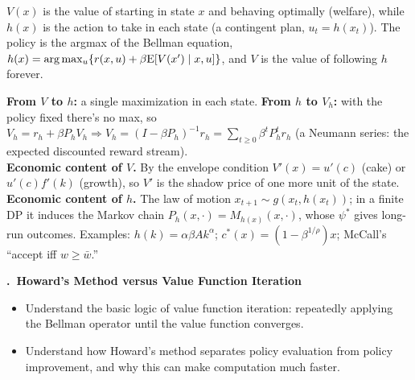\documentclass[11pt]{article}
\newcounter{qn}
\newcommand{\question}[1]{\par\needspace{14\baselineskip}\refstepcounter{qn}\medskip
{\bfseries\color{ink}\large \theqn.\ #1}\par\smallskip}
\begin{document}
\begin{resp}
$V(x)$ is the value of starting in state $x$ and behaving optimally (welfare), while $h(x)$ is the action to take in each state (a contingent plan, $u_t=h(x_t)$). The policy is the argmax of the Bellman equation, $h(x)=\arg\max_u\{r(x,u)+\beta\mathrm{E}[V(x')\mid x,u]\}$, and $V$ is the value of following $h$ forever.
\end{resp}
\begin{intu}
\textbf{From $V$ to $h$:} a single maximization in each state. \textbf{From $h$ to $V_h$:} with the policy fixed there's no max, so $V_h=r_h+\beta P_hV_h\Rightarrow V_h=(I-\beta P_h)^{-1}r_h=\sum_{t\ge0}\beta^tP_h^tr_h$ (a Neumann series: the expected discounted reward stream).\\
\textbf{Economic content of $V$.} By the envelope condition $V'(x)=u'(c)$ (cake) or $u'(c)f'(k)$ (growth), so $V'$ is the shadow price of one more unit of the state.\\
\textbf{Economic content of $h$.} The law of motion $x_{t+1}\sim g(x_t,h(x_t))$; in a finite DP it induces the Markov chain $P_h(x,\cdot)=M_{h(x)}(x,\cdot)$, whose $\psi^*$ gives long-run outcomes. Examples: $h(k)=\alpha\beta Ak^\alpha$; $c^*(x)=(1-\beta^{1/\rho})x$; McCall's ``accept iff $w\ge\bar w$.''
\end{intu}

\question{Howard's Method versus Value Function Iteration}
\begin{itemize}[leftmargin=1.2em,itemsep=0pt]\itshape
\item Understand the basic logic of value function iteration: repeatedly applying the Bellman operator until the value function converges.
\item Understand how Howard's method separates policy evaluation from policy improvement, and why this can make computation much faster.
\end{itemize}
\end{document}
